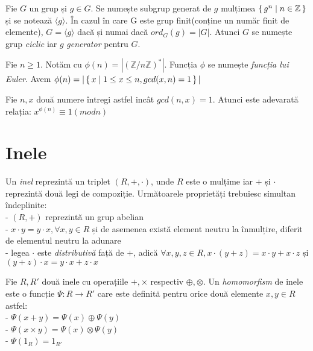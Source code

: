 \begin{dfn}
Fie $G$ un grup și $g \in G$. Se numește subgrup generat de $g$ mulțimea $\set{g^n\mid n\in \mathbb{Z}}$ și se notează $\langle g \rangle$. În cazul în care G este grup finit(conține un număr finit de elemente), $G = \langle g \rangle$ dacă și numai dacă $ord_G(g) = |G|$. Atunci $G$ se numește grup \textit{ciclic} iar $g$ \textit{generator} pentru $G$.
\end{dfn}

 \begin{dfn}
 Fie $n\geq 1$. Notăm cu $\phi (n) = |(\mathbb{Z}/n\mathbb{Z})^{*}|$. Funcția $\phi$ se numește \textit{funcția lui Euler}. Avem $\phi (n) = |\set{x\mid 1\leq x\leq n, gcd(x, n)=1}|$
 \end{dfn}
 
 \begin{teo}
 Fie $n, x$ două numere întregi astfel incât $gcd(n,x)=1$. Atunci este adevarată relația:
  $x^{\phi(n)}\equiv 1 (mod n)$
 \end{teo}


\section{Inele}
\label{sec:sec02}

\begin{dfn}
Un \textit{inel} reprezintă un triplet $(R, +, \cdot)$, unde $R$ este o mulțime iar $+$ și $\cdot$ reprezintă două legi de compoziție. Următoarele proprietăți trebuiesc simultan îndeplinite: 
\\ - $(R, +)$ reprezintă un grup abelian
\\ - $x \cdot y = y \cdot x, \forall x,y\in R$ și de asemenea există element neutru la înmulțire, diferit de elementul neutru la adunare
\\ - legea $\cdot$ este \textit{distributivă} față de $+$, adică $\forall x,y,z\in R, x\cdot (y + z) = x\cdot y + x\cdot z$ și $(y + z)\cdot x = y\cdot x + z\cdot x$ 
\end{dfn}

\begin{dfn}
Fie $R, R'$ două inele cu operațiile $+, \times$ respectiv $\oplus, \otimes$. Un \textit{homomorfism} de inele este o funcție $\Psi : R\rightarrow R'$ care este definită pentru orice două elemente $x, y\in R$ astfel:
\\ - $\Psi (x+y) = \Psi (x) \oplus \Psi (y)$
\\ - $\Psi (x\times y) = \Psi (x) \otimes \Psi (y)$
\\ - $\Psi (1_R) = 1_{R'}$
\end{dfn}

